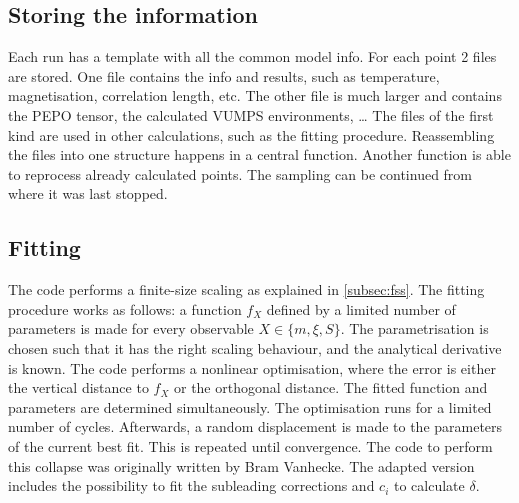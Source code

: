 \subsection{Storing the information}

Each run has a template with all the common model info. For each point 2 files are stored. One file contains the info and results, such as temperature, magnetisation, correlation length, etc. The other file is much larger and contains the PEPO tensor, the calculated VUMPS environments, \dots
The files of the first kind are used in other calculations, such as the fitting procedure.  Reassembling the files into one structure happens in a central function. Another function is able to reprocess already calculated points. The sampling can be continued from where it was last stopped.

\subsection{Fitting}\label{subsec:qphasediag}

The code performs a finite-size scaling as explained in \cref{subsec:fss}. The fitting procedure works as follows: a function $f_X$ defined by a limited number of parameters is made for every observable $X \in \{ m , \xi, S \}$. The parametrisation is chosen such that it has the right scaling behaviour, and the analytical derivative is known. The code performs a nonlinear optimisation, where the error is either the vertical distance to $f_X$ or the orthogonal distance. The fitted function and parameters are determined simultaneously. The optimisation runs for a limited number of cycles. Afterwards, a random displacement is made to the parameters of the current best fit. This is repeated until convergence. The code to perform this collapse was originally written by Bram Vanhecke. The adapted version includes the possibility to fit the subleading corrections and $c_i$ to calculate $\delta$.
